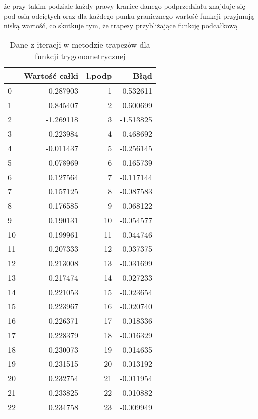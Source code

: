 \documentclass[12pt,twoside]{article}
\begin{document}
że przy takim podziale każdy prawy kraniec danego podprzedziału znajduje się pod osią odciętych oraz dla każdego punku granicznego wartość funkcji przyjmują niską wartość, co skutkuje tym, że trapezy przybliżające funkcję podcałkową 

\begin{table}[H]
\centering 
\caption{Dane z iteracji w metodzie trapezów dla funkcji trygonometrycznej}
\label{tabela2.2}
\begin{tabular}{lrrr}
\toprule
{} &  Wartość całki &  l.podp &      Błąd \\
\midrule
0  &      -0.287903 &       1 & -0.532611 \\
1  &       0.845407 &       2 &  0.600699 \\
2  &      -1.269118 &       3 & -1.513825 \\
3  &      -0.223984 &       4 & -0.468692 \\
4  &      -0.011437 &       5 & -0.256145 \\
5  &       0.078969 &       6 & -0.165739 \\
6  &       0.127564 &       7 & -0.117144 \\
7  &       0.157125 &       8 & -0.087583 \\
8  &       0.176585 &       9 & -0.068122 \\
9  &       0.190131 &      10 & -0.054577 \\
10 &       0.199961 &      11 & -0.044746 \\
11 &       0.207333 &      12 & -0.037375 \\
12 &       0.213008 &      13 & -0.031699 \\
13 &       0.217474 &      14 & -0.027233 \\
14 &       0.221053 &      15 & -0.023654 \\
15 &       0.223967 &      16 & -0.020740 \\
16 &       0.226371 &      17 & -0.018336 \\
17 &       0.228379 &      18 & -0.016329 \\
18 &       0.230073 &      19 & -0.014635 \\
19 &       0.231515 &      20 & -0.013192 \\
20 &       0.232754 &      21 & -0.011954 \\
21 &       0.233825 &      22 & -0.010882 \\
22 &       0.234758 &      23 & -0.009949 \\
\bottomrule
\end{tabular}
\end{table}
\end{document}
